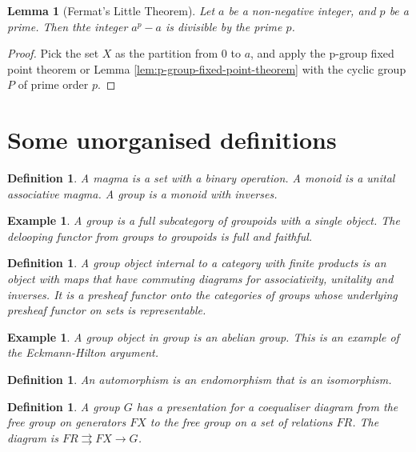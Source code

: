 \documentclass{tufte-book}
\newtheorem{definition}[theorem]{Definition}
\newtheorem{lemma}[theorem]{Lemma}
\newtheorem{example}[theorem]{Example}
\begin{document}
\begin{lemma}[Fermat's Little Theorem]
  Let $a$ be a non-negative integer, and $p$ be a prime.
  Then thte integer $a^p - a$ is divisible by the prime $p$. 
\end{lemma}

\begin{proof}
  Pick the set $X$ as the partition from $0$ to $a$, and apply the p-group fixed point theorem or Lemma \ref{lem:p-group-fixed-point-theorem} with the cyclic group $P$ of prime order $p$.
\end{proof}

\section{Some unorganised definitions}

\begin{definition}
  A magma is a set with a binary operation.
  A monoid is a unital associative magma.
  A group is a monoid with inverses.
\end{definition}

\begin{example}
  A group is a full subcategory of groupoids with a single object. The delooping functor from groups to groupoids is full and faithful.
\end{example}

\begin{definition}
  A group object internal to a category with finite products is an object with maps that have commuting diagrams for associativity, unitality and inverses. It is a presheaf functor onto the categories of groups whose underlying presheaf functor on sets is representable.
\end{definition}

\begin{example}
  A group object in group is an abelian group. This is an example of the Eckmann-Hilton argument.
\end{example}

\begin{definition}
  An automorphism is an endomorphism that is an isomorphism.
\end{definition}

\begin{definition}
  A group $G$ has a presentation for a coequaliser diagram from the free group on generators $FX$ to the free group on a set of relations $FR$.
  The diagram is $FR \rightrightarrows FX \rightarrow G$.
\end{definition}
\end{document}

